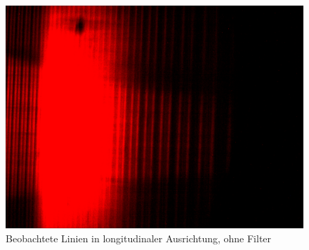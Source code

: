       \begin{figure}[H]
        \centering
        \includegraphics[width=.6\paperwidth, trim={0 200pt 0 400pt}, clip]{Auswertung/data/long/10A_0}
        \caption{Beobachtete Linien in longitudinaler Ausrichtung, ohne Filter}
        \label{pic::1}
      \end{figure}
